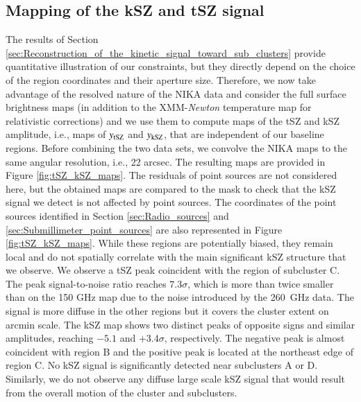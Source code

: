 \documentclass[twocolumn,traditabstract]{aa}
\begin{document}
\subsection{Mapping of the kSZ and tSZ signal}
The results of Section \ref{sec:Reconstruction_of_the_kinetic_signal_toward_sub_clusters} provide quantitative illustration of our constraints, but they directly depend on the choice of the region coordinates and their aperture size. Therefore, we now take advantage of the resolved nature of the NIKA data and consider the full surface brightness maps (in addition to the XMM-\textit{Newton} temperature map for relativistic corrections) and we use them to compute maps of the tSZ and kSZ amplitude, i.e., maps of $y_{\rm tSZ}$ and $y_{\rm kSZ}$, that are independent of our baseline regions. Before combining the two data sets, we convolve the NIKA maps to the same angular resolution, i.e., 22 arcsec. The resulting maps are provided in Figure \ref{fig:tSZ_kSZ_maps}. The residuals of point sources are not considered here, but the obtained maps are compared to the mask to check that the kSZ signal we detect is not affected by point sources. The coordinates of the point sources identified in Section \ref{sec:Radio_sources} and \ref{sec:Submillimeter_point_sources} are also represented in Figure \ref{fig:tSZ_kSZ_maps}. While these regions are potentially biased, they remain local and do not spatially correlate with the main significant kSZ structure that we observe. We observe a tSZ peak coincident with the region of subcluster C. The peak signal-to-noise ratio reaches $7.3 \sigma$, which is more than twice smaller than on the 150 GHz map due to the noise introduced by the 260~GHz data. The signal is more diffuse in the other regions but it covers the cluster extent on arcmin scale. The kSZ map shows two distinct peaks of opposite signs and similar amplitudes, reaching $-5.1$ and $+3.4 \sigma$, respectively. The negative peak is almost coincident with region B and the positive peak is located at the northeast edge of region C. No kSZ signal is significantly detected near subclusters A or D. Similarly, we do not observe any diffuse large scale kSZ signal that would result from the overall motion of the cluster and subclusters.
\end{document}
